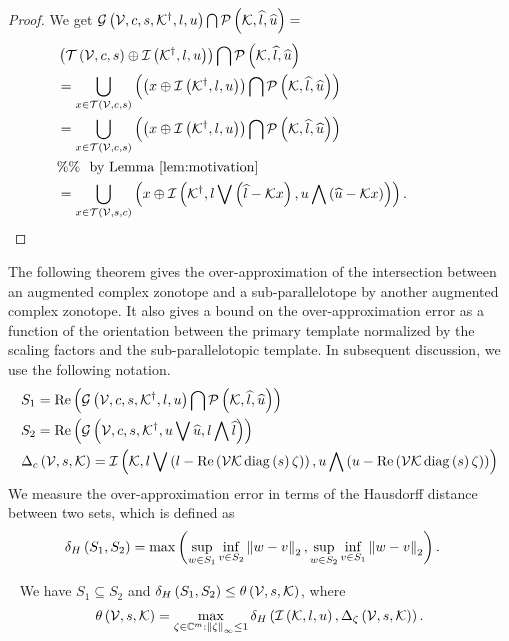 \begin{proof}
We get $\mathcal{G}\left(\mathcal{V},c,s,{\mathcal{K}}^\dagger,l,u\right)\bigcap\mathcal{P}\left(\mathcal{K},\widehat{l},\widehat{u}\right)=$
%
\begin{align*}
& \left(\mathit{\operatorname{\mathcal{T}}}\left(\mathcal{V},c,s\right)\oplus\mathit{\operatorname{\mathcal{I}}}\left({\mathcal{K}}^\dagger,l,u\right)\right)\bigcap\mathcal{P}\left(\mathcal{K},\widehat{l},\widehat{u}\right)\\
& =
\bigcup_{x\in\mathit{\operatorname{\mathcal{T}}}\left(\mathcal{V},c,s\right)}\left(\left(x\oplus\mathit{\operatorname{\mathcal{I}}}\left({\mathcal{K}}^\dagger,l,u\right)\right)\bigcap\mathcal{P}\left(\mathcal{K},\widehat{l},\widehat{u}\right)\right)\\
& =\bigcup_{x\in\mathit{\operatorname{\mathcal{T}}}\left(\mathcal{V},c,s\right)}\left(\left(x\oplus\mathit{\operatorname{\mathcal{I}}}\left({\mathcal{K}}^\dagger,l,u\right)\right)\bigcap\mathcal{P}\left(\mathcal{K},\widehat{l},\widehat{u}\right)\right)\\
& \%\%~~\text{by Lemma~\ref{lem:motivation}}\\
& = \bigcup_{x\in\mathit{\operatorname{\mathcal{T}}}\left(\mathcal{V},s,c\right)}\left(x\oplus\mathit{\operatorname{\mathcal{I}}}\left({\mathcal{K}}^\dagger,l\bigvee \left(\widehat{l}-\mathcal{K}
  x\right),u\bigwedge \left(\widehat{u}-\mathcal{K} x\right)\right)\right).\hspace{4em}\qedhere
\end{align*}
%
\end{proof}
%
The following theorem gives the over-approximation of the intersection
between an augmented complex zonotope and a sub-parallelotope by
another augmented complex zonotope.  It also gives a bound on the
over-approximation error as a function of the orientation between the
primary template normalized by the scaling factors and the
sub-parallelotopic template.  In subsequent discussion, we use the
following notation.
%
\begin{align*}
  & S_1=\operatorname{Re}\left(\mathcal{G}\left(\mathcal{V},c,s,{\mathcal{K}}^\dagger,l,u\right)\bigcap \mathcal{P}\left(\mathcal{K},\widehat{l},\widehat{u}\right)\right)\\
  & S_2=\operatorname{Re}\left(\mathcal{G}\left(\mathcal{V},c,s,{\mathcal{K}}^\dagger,u\bigvee \widehat{u},l\bigwedge \widehat{l}\right)\right)\\
  & \Delta_{c}\left(\mathcal{V},s,\mathcal{K}\right)=\mathit{\operatorname{\mathcal{I}}}\left(\mathcal{K},l\bigvee \left(l-\operatorname{Re}\left(\mathcal{V}\mathcal{K}\operatorname{diag}\left(s\right)\zeta\right)\right),u\bigwedge \left(u-\operatorname{Re}\left(\mathcal{V}\mathcal{K}\operatorname{diag}\left(s\right)\zeta\right)\right)\right)
\end{align*}
%
We measure the over-approximation error in terms of the Hausdorff
distance between two sets, which is defined as
%
\begin{align*}
& \delta_H\left(S_1,S_2\right)=\max\left(\sup_{w\in S_1}\inf_{v\in
  S_2}\left\|w-v\right\|_{2},\sup_{w\in S_2}\inf_{v\in S_1}\left\|w-v\right\|_{2}\right).
\end{align*}
%
\begin{theorem}~\label{thm:acz-ptope-intersection}
  We have $S_1\subseteq S_2$ and
  $\delta_H\left(S_1,S_2\right)\leq\theta\left(\mathcal{V},s,\mathcal{K}\right)$, where
  \[
  \theta\left(\mathcal{V},s,\mathcal{K}\right)=
  \max_{\zeta\in\mathbb{C}^m:\left\|\zeta\right\|_{\infty}\leq
    1}\delta_H\left(\mathit{\operatorname{\mathcal{I}}}\left(\mathcal{K},l,u\right),\Delta_{\zeta}\left(\mathcal{V},s,\mathcal{K}\right)\right).
  \]
\end{theorem}
